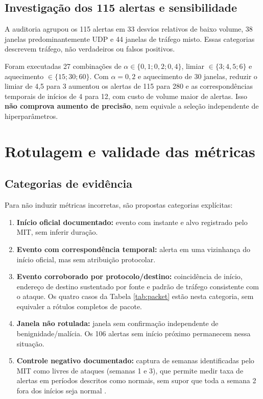 \documentclass[12pt,oneside,a4paper,brazil]{abntex2}
\begin{document}
\section{Investigação dos 115 alertas e sensibilidade}
A auditoria agrupou os 115 alertas em 33 desvios relativos de baixo volume, 38 janelas predominantemente UDP e 44 janelas de tráfego misto. Essas categorias descrevem tráfego, não verdadeiros ou falsos positivos.

Foram executadas 27 combinações de $\alpha\in\{0{,}1;0{,}2;0{,}4\}$, limiar $\in\{3;4{,}5;6\}$ e aquecimento $\in\{15;30;60\}$. Com $\alpha=0{,}2$ e aquecimento de 30 janelas, reduzir o limiar de 4,5 para 3 aumentou os alertas de 115 para 280 e as correspondências temporais de inícios de 4 para 12, com custo de volume maior de alertas. Isso \textbf{não comprova aumento de precisão}, nem equivale a seleção independente de hiperparâmetros.

\chapter{Rotulagem e validade das métricas}
\section{Categorias de evidência}
Para não induzir métricas incorretas, são propostas categorias explícitas:\begin{enumerate}
\item \textbf{Início oficial documentado:} evento com instante e alvo registrado pelo MIT, sem inferir duração.
\item \textbf{Evento com correspondência temporal:} alerta em uma vizinhança do início oficial, mas sem atribuição protocolar.
\item \textbf{Evento corroborado por protocolo/destino:} coincidência de início, endereço de destino sustentado por fonte e padrão de tráfego consistente com o ataque. Os quatro casos da Tabela \ref{tab:packet} estão nesta categoria, sem equivaler a rótulos completos de pacote.
\item \textbf{Janela não rotulada:} janela sem confirmação independente de benignidade/malícia. Os 106 alertas sem início próximo permanecem nessa situação.
\item \textbf{Controle negativo documentado:} captura de semanas identificadas pelo MIT como livres de ataques (semanas 1 e 3), que permite medir taxa de alertas em períodos descritos como normais, sem supor que toda a semana 2 fora dos inícios seja normal \cite{mitdados}.
\end{enumerate}
\end{document}
